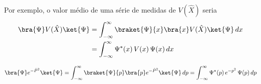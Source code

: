 Por exemplo, o valor médio de uma série de medidas de $V(\hat{X})$ seria
\begin{align}
    \bra{\Psi}V(\hat{X})\ket{\Psi} &= \int_{-\infty}^{\infty} \braket{\Psi}{x}\bra{x}V(\hat{X})\ket{\Psi}\,dx \notag \\
    &= \int_{-\infty}^{\infty} \Psi^*(x)\,V(x)\,\Psi(x)\,dx
\label{eq:aula13_valor_medio_VX}
\end{align}

\begin{equation}
    \bra{\Psi}e^{-\hat{P}^2}\ket{\Psi} = \int_{-\infty}^{\infty} \braket{\Psi}{p}\bra{p}e^{-\hat{P}^2}\ket{\Psi}\,dp = \int_{-\infty}^{\infty} \Psi^*(p)\,e^{-p^2}\,\Psi(p)\,dp
\label{eq:aula13_valor_medio_eP2}
\end{equation}
